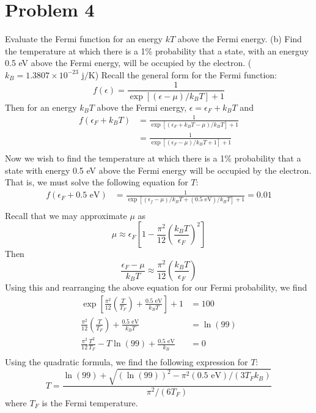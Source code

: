 \documentclass{article}
\begin{document}
\section*{Problem 4}
Evaluate the Fermi function for an energy $kT$ above the Fermi energy. (b) Find the temperature at which there is a 1\% probability that a state, with an energuy 0.5 eV above the Fermi energy, will be occupied by the electron. ($k_B = 1.3807\times 10^{-23} \text{ j/K}$)
\newline\newline
Recall the general form for the Fermi function:
\[f(\epsilon) = \frac{1}{\exp{\left[(\epsilon - \mu)/k_BT\right]} + 1}\]
Then for an energy $k_BT$ above the Fermi energy, $\epsilon = \epsilon_F + k_BT$ and
\begin{align*}
    f(\epsilon_F + k_BT) &= \frac{1}{\exp{[(\epsilon_F + k_BT - \mu)/k_BT]} + 1} \\
    &= \frac{1}{\exp{[(\epsilon_F - \mu)/k_BT + 1]} + 1} \\
\end{align*}
Now we wish to find the temperature at which there is a 1\% probability that a state with energy 0.5 eV above the Fermi energy will be occupied by the electron. That is, we must solve the following equation for $T$:
\begin{align*}
    f(\epsilon_F + 0.5 \text{ eV}) &= \frac{1}{\exp{[(\epsilon_f - \mu)/k_BT + (0.5 \text{ eV})/k_BT]} + 1} = 0.01 \\
\end{align*}
Recall that we may approximate $\mu$ as
\[\mu \approx \epsilon_F \left[1 - \frac{\pi^2}{12}\left(\frac{k_BT}{\epsilon_F}\right)^2\right]\]
Then
\[\frac{\epsilon_F - \mu}{k_BT} \approx \frac{\pi^2}{12}\left(\frac{k_BT}{\epsilon_F}\right)\]
Using this and rearranging the above equation for our Fermi probability, we find
\begin{align*}
    \exp{\left[\frac{\pi^2}{12}\left(\frac{T}{T_F}\right) + \frac{0.5 \text{ eV}}{k_BT}\right]} + 1&= 100 \\
    \frac{\pi^2}{12}\left(\frac{T}{T_F}\right) + \frac{0.5 \text{ eV}}{k_BT} &= \ln{(99)} \\
    \frac{\pi^2}{12}\frac{T^2}{T_F} - T\ln{(99)} + \frac{0.5 \text{ eV}}{k_B} &= 0 \\
\end{align*}
Using the quadratic formula, we find the following expression for $T$:
\[T = \frac{\ln{(99)} + \sqrt{(\ln{(99)})^2 - \pi^2(0.5 \text{ eV})/(3T_Fk_B)}}{\pi^2/(6T_F)}\]
where $T_F$ is the Fermi temperature.
\end{document}

